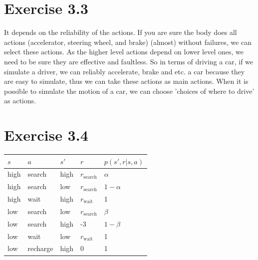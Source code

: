 \documentclass[12pt, a4paper]{article}
\begin{document}
    \section{Exercise 3.3}
        It depends on the reliability of the actions. If you are sure the
        body does all actions (accelerator, steering wheel, and brake)
        (almost) without failures, we can select these actions. As the higher
        level actions depend on lower level ones, we need to be sure they
        are effective and faultless. So in terms of driving a car, if we
        simulate a driver, we can reliably accelerate, brake and etc. a car
        because they are easy to simulate, thus we can take these actions as
        main actions. When it is possible to simulate the motion of a car,
        we can choose 'choices of where to drive' as actions.

    \section{Exercise 3.4}
        \begin{table}[H]
        \centering
        \begin{tabular}{|ll|ll|l|}
            \hline
            \rowcolor[HTML]{9B9B9B}
            $s$  & $a$      & $s'$ & $r$                 & $p(s',r|s,a)$ \\ \hline
            high & search   & high & $r_{\text{search}}$ & $\alpha$      \\
            high & search   & low  & $r_{\text{search}}$ & $1 - \alpha$  \\
            high & wait     & high & $r_{\text{wait}}$   & 1             \\
            low  & search   & low  & $r_{\text{search}}$ & $\beta$       \\
            low  & search   & high & -3                  & $1 - \beta$   \\
            low  & wait     & low  & $r_{\text{wait}}$   & 1             \\
            low  & recharge & high & 0                   & 1             \\ \hline
        \end{tabular}
        \end{table}
\end{document}
